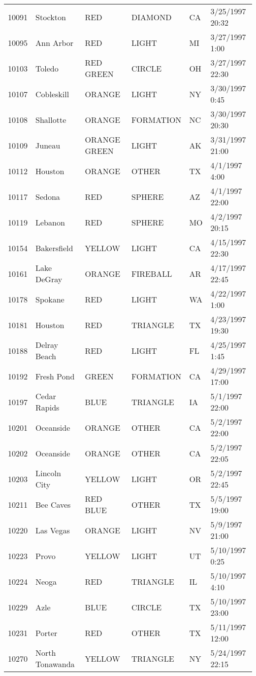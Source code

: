 \begin{tabular}{llllll}
10091 & Stockton & RED & DIAMOND & CA & 3/25/1997 20:32 \\
10095 & Ann Arbor & RED & LIGHT & MI & 3/27/1997 1:00 \\
10103 & Toledo & RED GREEN & CIRCLE & OH & 3/27/1997 22:30 \\
10107 & Cobleskill & ORANGE & LIGHT & NY & 3/30/1997 0:45 \\
10108 & Shallotte & ORANGE & FORMATION & NC & 3/30/1997 20:30 \\
10109 & Juneau & ORANGE GREEN & LIGHT & AK & 3/31/1997 21:00 \\
10112 & Houston & ORANGE & OTHER & TX & 4/1/1997 4:00 \\
10117 & Sedona & RED & SPHERE & AZ & 4/1/1997 22:00 \\
10119 & Lebanon & RED & SPHERE & MO & 4/2/1997 20:15 \\
10154 & Bakersfield & YELLOW & LIGHT & CA & 4/15/1997 22:30 \\
10161 & Lake DeGray & ORANGE & FIREBALL & AR & 4/17/1997 22:45 \\
10178 & Spokane & RED & LIGHT & WA & 4/22/1997 1:00 \\
10181 & Houston & RED & TRIANGLE & TX & 4/23/1997 19:30 \\
10188 & Delray Beach & RED & LIGHT & FL & 4/25/1997 1:45 \\
10192 & Fresh Pond & GREEN & FORMATION & CA & 4/29/1997 17:00 \\
10197 & Cedar Rapids & BLUE & TRIANGLE & IA & 5/1/1997 22:00 \\
10201 & Oceanside & ORANGE & OTHER & CA & 5/2/1997 22:00 \\
10202 & Oceanside & ORANGE & OTHER & CA & 5/2/1997 22:05 \\
10203 & Lincoln City & YELLOW & LIGHT & OR & 5/2/1997 22:45 \\
10211 & Bee Caves & RED BLUE & OTHER & TX & 5/5/1997 19:00 \\
10220 & Las Vegas & ORANGE & LIGHT & NV & 5/9/1997 21:00 \\
10223 & Provo & YELLOW & LIGHT & UT & 5/10/1997 0:25 \\
10224 & Neoga & RED & TRIANGLE & IL & 5/10/1997 4:10 \\
10229 & Azle & BLUE & CIRCLE & TX & 5/10/1997 23:00 \\
10231 & Porter & RED & OTHER & TX & 5/11/1997 12:00 \\
10270 & North Tonawanda & YELLOW & TRIANGLE & NY & 5/24/1997 22:15 \\

\end{tabular}
